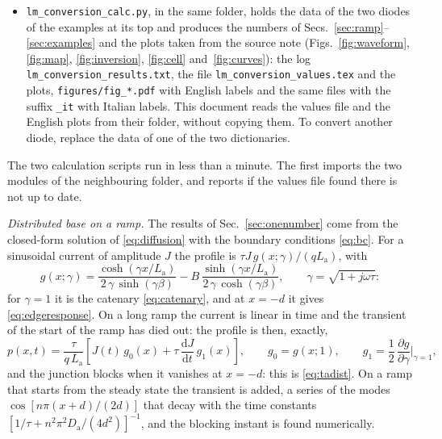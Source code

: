 \documentclass[10pt,a4paper]{scrartcl}
\newcommand{\diff}{\mathrm{d}}
\newcommand{\Da}{D_\mathrm{a}}
\newcommand{\La}{L_\mathrm{a}}
\newcommand{\dpar}[2]{\frac{\partial #1}{\partial #2}}
\begin{document}
\begin{itemize}
\item \texttt{lm\_conversion\_calc.py}, in the same folder, holds the data of the two diodes of the examples at its top and produces the numbers of Secs.~\ref{sec:ramp}--\ref{sec:examples} and the plots taken from the source note (Figs.~\ref{fig:waveform}, \ref{fig:map}, \ref{fig:inversion}, \ref{fig:cell} and~\ref{fig:curves}): the log \texttt{lm\_conversion\_results.txt}, the file \texttt{lm\_conversion\_values.tex} and the plots, \texttt{figures/fig\_*.pdf} with English labels and the same files with the suffix \texttt{\_it} with Italian labels. This document reads the values file and the English plots from their folder, without copying them. To convert another diode, replace the data of one of the two dictionaries.
\end{itemize}
The two calculation scripts run in less than a minute. The first imports the two modules of the neighbouring folder, and reports if the values file found there is not up to date.

\emph{Distributed base on a ramp.} The results of Sec.~\ref{sec:onenumber} come from the closed-form solution of \eqref{eq:diffusion} with the boundary conditions \eqref{eq:bc}. For a sinusoidal current of amplitude $J$ the profile is $\tau J\,g(x;\gamma)/(q\La)$, with
\begin{equation}
g(x;\gamma) = \frac{\cosh(\gamma x/\La)}{2\,\gamma\,\sinh(\gamma\beta)} - B\,\frac{\sinh(\gamma x/\La)}{2\,\gamma\,\cosh(\gamma\beta)} , \qquad \gamma = \sqrt{1+j\omega\tau} :
\label{eq:gprofile}
\end{equation}
for $\gamma = 1$ it is the catenary \eqref{eq:catenary}, and at $x = -d$ it gives \eqref{eq:edgeresponse}. On a long ramp the current is linear in time and the transient of the start of the ramp has died out: the profile is then, exactly,
\begin{equation}
p(x,t) = \frac{\tau}{q\,\La}\left[J(t)\,g_0(x) + \tau\,\frac{\diff J}{\diff t}\,g_1(x)\right] , \qquad g_0 = g(x;1) , \qquad g_1 = \frac12\,\dpar{g}{\gamma}\bigg|_{\gamma=1} ,
\label{eq:rampprofile}
\end{equation}
and the junction blocks when it vanishes at $x = -d$: this is \eqref{eq:tadist}. On a ramp that starts from the steady state the transient is added, a series of the modes $\cos[n\pi(x+d)/(2d)]$ that decay with the time constants $[1/\tau + n^2\pi^2\Da/(4d^2)]^{-1}$, and the blocking instant is found numerically.
\end{document}
